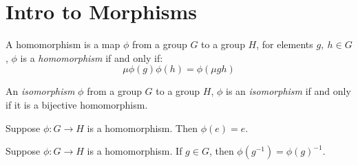 \section{Intro to Morphisms}

\begin{definition}[Homomorphism]
    \label{definition : Homomorphism}
    \leanok
    A homomorphism is a map \( \phi \) from a group \( G \) to a group \( H \), for
    elements \( g,~ h \in G \), \( \phi \) is a
    \emph{homomorphism} if and only if:
    \[
        \mu \phi(g)\phi(h) = \phi(\mu gh)
    \]
\end{definition}

\begin{definition}[Isomorphism]
    \label{definition : Isomorphism}
    \leanok
    An \emph{isomorphism} \( \phi \) from a group \( G \) to a group \( H \), \( \phi
    \) is an \emph{isomorphism} if and only if it is a bijective homomorphism.
\end{definition}

\begin{theorem}
    \label{theorem : hom_id_to_id}
    \leanok
    Suppose \( \phi : G \rightarrow H \) is a homomorphism. Then \( \phi(e) = e \).
\end{theorem}

\begin{theorem}
    \label{theorem : hom_inv_to_inv}
    \leanok
    Suppose \( \phi : G \rightarrow H \) is a homomorphism. If \(g \in G \), then \( \phi(g^{-1}) = \phi(g)^{-1} \).
\end{theorem}
